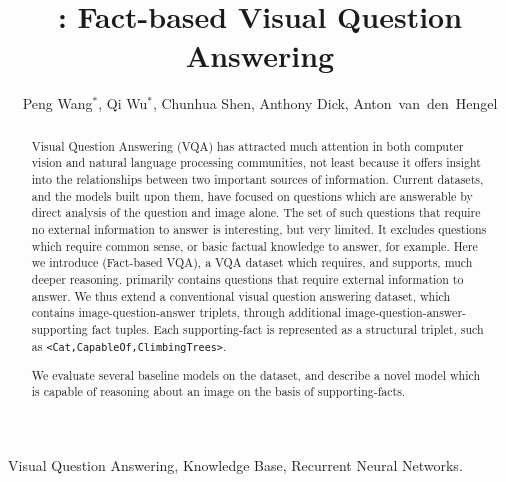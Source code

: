 \documentclass[10pt,journal]{IEEEtran}
\begin{document}
\sloppy

\title{\KBName: Fact-based Visual Question Answering }
\author{Peng Wang$^*$,
        Qi Wu$^*$,
        Chunhua Shen,
        Anthony Dick,
        Anton~van~den~Hengel
}


\maketitle



\begin{abstract}

Visual Question Answering (VQA) has attracted much attention in both computer vision and natural language processing communities, not least because it offers insight into the relationships between two important sources of information.
Current datasets, and the models built upon them, have focused on questions which are answerable by direct analysis of the question and image alone.  The set of such questions that require no external information to answer is interesting, but very limited.  It excludes questions which require common sense, or basic factual knowledge to answer, for example.
Here we introduce \KBName (Fact-based VQA), a VQA dataset which requires, and supports, much deeper reasoning.
\KBName primarily contains questions that require external information to answer.
We thus extend a conventional visual question answering dataset, which contains {image-question-answer} triplets, through additional {image-question-answer-supporting fact} tuples.
Each supporting-fact is represented as a structural triplet, such as \texttt{<Cat,CapableOf,ClimbingTrees>}.

We evaluate several baseline models on the \KBName dataset, and describe a novel model which is capable of reasoning about an image on the basis of supporting-facts.

\end{abstract}

\begin{IEEEkeywords}
  Visual Question Answering, Knowledge Base, Recurrent Neural Networks.
\end{IEEEkeywords}
\end{document}
